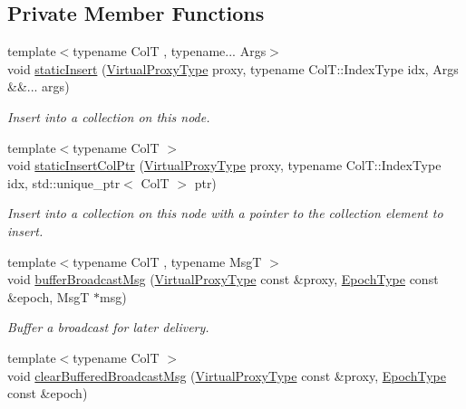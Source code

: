 \subsection*{Private Member Functions}
\begin{DoxyCompactItemize}
\item 
{\footnotesize template$<$typename ColT , typename... Args$>$ }\\void \hyperlink{structvt_1_1vrt_1_1collection_1_1_collection_manager_a93eeb08585ad7a41c72e45ccd23be48c}{static\+Insert} (\hyperlink{namespacevt_a1b417dd5d684f045bb58a0ede70045ac}{Virtual\+Proxy\+Type} proxy, typename Col\+T\+::\+Index\+Type idx, Args \&\&... args)
\begin{DoxyCompactList}\small\item\em Insert into a collection on this node. \end{DoxyCompactList}\item 
{\footnotesize template$<$typename ColT $>$ }\\void \hyperlink{structvt_1_1vrt_1_1collection_1_1_collection_manager_a41dc3a182eee1cdb2ce5aa1e47b5928f}{static\+Insert\+Col\+Ptr} (\hyperlink{namespacevt_a1b417dd5d684f045bb58a0ede70045ac}{Virtual\+Proxy\+Type} proxy, typename Col\+T\+::\+Index\+Type idx, std\+::unique\+\_\+ptr$<$ ColT $>$ ptr)
\begin{DoxyCompactList}\small\item\em Insert into a collection on this node with a pointer to the collection element to insert. \end{DoxyCompactList}\item 
{\footnotesize template$<$typename ColT , typename MsgT $>$ }\\void \hyperlink{structvt_1_1vrt_1_1collection_1_1_collection_manager_aba07682da41648437cacd485193063ec}{buffer\+Broadcast\+Msg} (\hyperlink{namespacevt_a1b417dd5d684f045bb58a0ede70045ac}{Virtual\+Proxy\+Type} const \&proxy, \hyperlink{namespacevt_a985a5adf291c34a3ca263b3378388236}{Epoch\+Type} const \&epoch, MsgT $\ast$msg)
\begin{DoxyCompactList}\small\item\em Buffer a broadcast for later delivery. \end{DoxyCompactList}\item 
{\footnotesize template$<$typename ColT $>$ }\\void \hyperlink{structvt_1_1vrt_1_1collection_1_1_collection_manager_a0366f1427431dcd6fedd41dee9a3fcce}{clear\+Buffered\+Broadcast\+Msg} (\hyperlink{namespacevt_a1b417dd5d684f045bb58a0ede70045ac}{Virtual\+Proxy\+Type} const \&proxy, \hyperlink{namespacevt_a985a5adf291c34a3ca263b3378388236}{Epoch\+Type} const \&epoch)

\end{DoxyCompactItemize}
